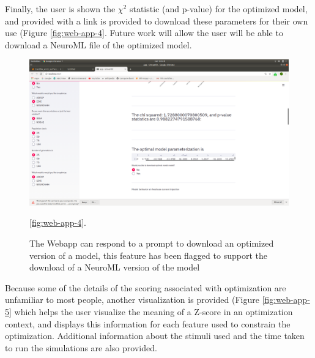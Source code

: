 Finally, the user is shown the $\chi^{2}$ statistic (and p-value) for the optimized model, and provided with a link is provided to download these parameters for their own use (Figure \ref{fig:web-app-4}.
Future work will allow the user will be able to download a NeuroML file of the optimized model.

\begin{figure}
\begin{center}
\includegraphics[scale=1]{chapters/app_tex/Screenshot from 2020-09-19 10-46-32}
\end{center}
\caption[Webapp prompt to download optimized model]{The Webapp can respond to a prompt to download an optimized version of a model, this feature has been flagged to support the download of a NeuroML version of the model}
\ref{fig:web-app-4}.
\end{figure}

Because some of the details of the scoring associated with optimization are unfamiliar to most people, another visualization is provided (Figure \ref{fig:web-app-5} which helps the user visualize the meaning of a Z-score in an optimization context, and displays this information for each feature used to constrain the optimization.
Additional information about the stimuli used and the time taken to run the simulations are also provided.

